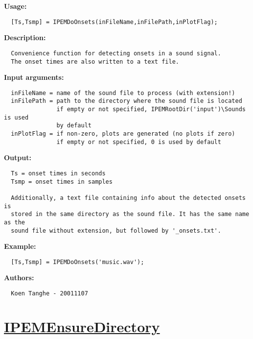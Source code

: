 \textbf{Usage:}
\begin{verbatim}  [Ts,Tsmp] = IPEMDoOnsets(inFileName,inFilePath,inPlotFlag);

\end{verbatim}
\textbf{Description:}
\begin{verbatim}  Convenience function for detecting onsets in a sound signal.
  The onset times are also written to a text file.

\end{verbatim}
\textbf{Input arguments:}
\begin{verbatim}  inFileName = name of the sound file to process (with extension!)
  inFilePath = path to the directory where the sound file is located
               if empty or not specified, IPEMRootDir('input')\Sounds is used
               by default
  inPlotFlag = if non-zero, plots are generated (no plots if zero)
               if empty or not specified, 0 is used by default

\end{verbatim}
\textbf{Output:}
\begin{verbatim}  Ts = onset times in seconds
  Tsmp = onset times in samples

  Additionally, a text file containing info about the detected onsets is
  stored in the same directory as the sound file. It has the same name as the
  sound file without extension, but followed by '_onsets.txt'.

\end{verbatim}
\textbf{Example:}
\begin{verbatim}  [Ts,Tsmp] = IPEMDoOnsets('music.wav');

\end{verbatim}
\textbf{Authors:}
\begin{verbatim}  Koen Tanghe - 20011107
\end{verbatim}


\newpage
\section*{\hyperlink{Concepts:IPEMEnsureDirectory}{IPEMEnsureDirectory}}
\hypertarget{FuncRef:IPEMEnsureDirectory}{}


